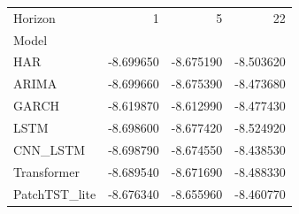 \begin{tabular}{lrrr}
\toprule
Horizon & 1 & 5 & 22 \\
Model &  &  &  \\
\midrule
HAR & -8.699650 & -8.675190 & -8.503620 \\
ARIMA & -8.699660 & -8.675390 & -8.473680 \\
GARCH & -8.619870 & -8.612990 & -8.477430 \\
LSTM & -8.698600 & -8.677420 & -8.524920 \\
CNN_LSTM & -8.698790 & -8.674550 & -8.438530 \\
Transformer & -8.689540 & -8.671690 & -8.488330 \\
PatchTST_lite & -8.676340 & -8.655960 & -8.460770 \\
\bottomrule
\end{tabular}
